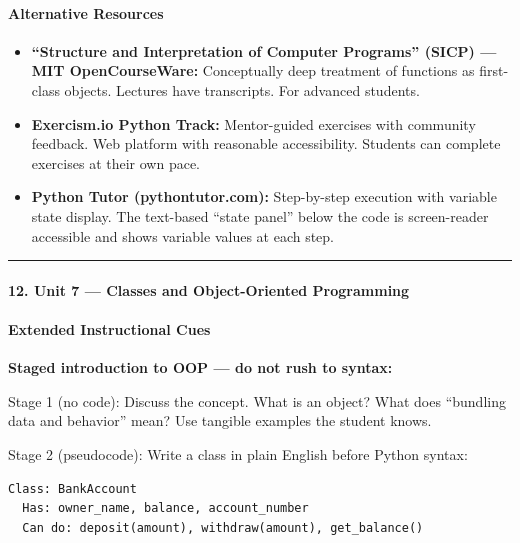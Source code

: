 \documentclass[
  justified,
  openright,
]{tufte-book}
\let\subsection\paragraph
\let\paragraph\paragraph
\let\subsection\paragraph
\let\paragraph\paragraph
\providecommand{\tightlist}{%
  \setlength{\itemsep}{0pt}\setlength{\parskip}{0pt}}
\begin{document}
\paragraph{Alternative Resources}\label{alternative-resources-4}

\begin{itemize}
\tightlist
\item
  \textbf{``Structure and Interpretation of Computer Programs'' (SICP)
  --- MIT OpenCourseWare:} Conceptually deep treatment of functions as
  first-class objects. Lectures have transcripts. For advanced students.
\item
  \textbf{Exercism.io Python Track:} Mentor-guided exercises with
  community feedback. Web platform with reasonable accessibility.
  Students can complete exercises at their own pace.
\item
  \textbf{Python Tutor (pythontutor.com):} Step-by-step execution with
  variable state display. The text-based ``state panel'' below the code
  is screen-reader accessible and shows variable values at each step.
\end{itemize}

\begin{center}\rule{0.5\linewidth}{0.5pt}\end{center}

\subsection{12. Unit 7 --- Classes and Object-Oriented
Programming}\label{unit-7-classes-and-object-oriented-programming}

\subsection{Extended Instructional
Cues}\label{extended-instructional-cues}

\textbf{Staged introduction to OOP --- do not rush to syntax:}

Stage 1 (no code): Discuss the concept. What is an object? What does
``bundling data and behavior'' mean? Use tangible examples the student
knows.

Stage 2 (pseudocode): Write a class in plain English before Python
syntax:

\begin{verbatim}
Class: BankAccount
  Has: owner_name, balance, account_number
  Can do: deposit(amount), withdraw(amount), get_balance()
\end{verbatim}
\end{document}
